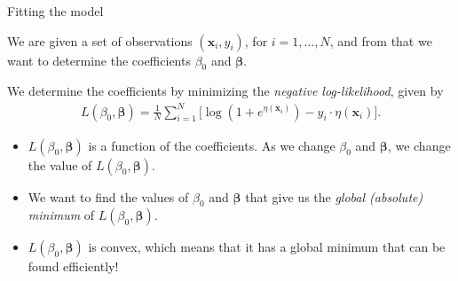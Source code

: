 \documentclass[8pt]{beamer}
\newcommand{\mys}{\vspace{0.5cm} %
}
\begin{document}
\begin{frame}{\color{white} Fitting the model}

We are given a set of observations $(\bm{x}_i, y_i)$, for $i = 1, \ldots, N$, and from that we want to determine the coefficients $\beta_0$ and $\bm{\beta}$. \mys

We determine the coefficients by minimizing the \textit{negative log-likelihood}, given by 
\begin{align}
    \label{negloglike}
    L(\beta_0, \bm{\beta}) = \frac{1}{N} \sum_{i = 1}^N \Big[ \log \left(1 + e^{\eta(\bm{x}_i)}  \right)  - y_i \cdot \eta(\bm{x}_i) \Big].
\end{align}
\begin{itemize}
    \item $L(\beta_0, \bm{\beta})$ is a function of the coefficients. As we change $\beta_0$ and $\bm{\beta}$, we change the value of $L(\beta_0, \bm{\beta})$.
    \item We want to find the values of $\beta_0$ and $\bm{\beta}$ that give us the \textit{global (absolute) minimum} of $L(\beta_0, \bm{\beta})$.
    \item $L(\beta_0, \bm{\beta})$ is convex, which means that it has a global minimum that can be found efficiently!
\end{itemize}
    
\end{frame}
\end{document}
